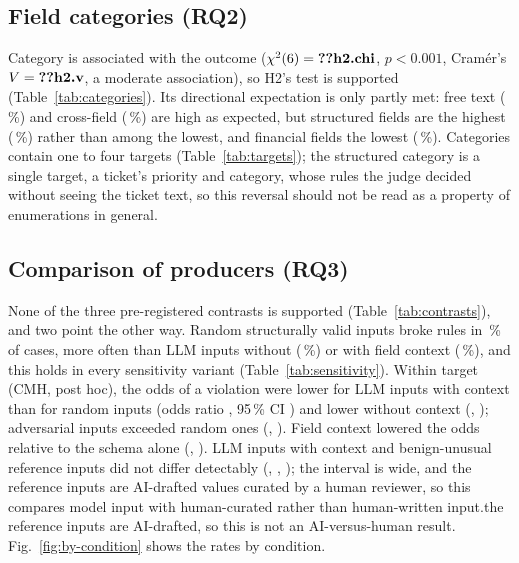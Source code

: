 \documentclass[conference]{IEEEtran}
\begin{document}

\subsection{Field categories (RQ2)}

Category is associated with the outcome ($\chi^2(6)=\R{h2.chi}$, $p<0.001$, Cram\'er's
$V=\R{h2.v}$, a moderate association), so H2's test is supported (Table~\ref{tab:categories}). Its
directional expectation is only partly met: free text (\,\%) and cross-field
(\,\%) are high as expected, but structured fields are the highest
(\,\%) rather than among the lowest, and financial fields the lowest
(\,\%). Categories contain one to four targets (Table~\ref{tab:targets}); the
structured category is a single target, a ticket's priority and category, whose rules the judge
decided without seeing the ticket text, so this reversal should not be read as a property of
enumerations in general.

\subsection{Comparison of producers (RQ3)}

None of the three pre-registered contrasts is supported (Table~\ref{tab:contrasts}), and two point the
other way. Random structurally valid inputs broke rules in \,\% of cases, more often than
LLM inputs without (\,\%) or with field context (\,\%), and this holds in every
sensitivity variant (Table~\ref{tab:sensitivity}). Within target (CMH, post hoc), the odds of a
violation were lower for LLM inputs with context than for random inputs (odds ratio ,
95\,\% CI ) and lower without context (, ); adversarial
inputs exceeded random ones (, ). Field context lowered the odds relative
to the schema alone (, ). LLM inputs with context and benign-unusual
reference inputs did not differ detectably (, , ); the
interval is wide, and \ifreviewed the reference inputs are AI-drafted values curated by a human reviewer,
so this compares model input with human-curated rather than human-written input.\else the reference
inputs are AI-drafted, so this is not an AI-versus-human result.\fi
Fig.~\ref{fig:by-condition} shows the rates by condition.
\end{document}
